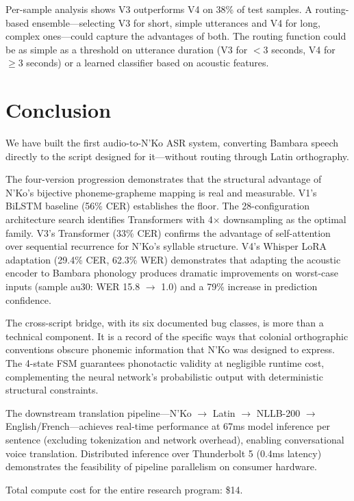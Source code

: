 \documentclass[11pt]{article}
\begin{document}
Per-sample analysis shows V3 outperforms V4 on 38\% of test samples.
A routing-based ensemble---selecting V3 for short, simple utterances and V4 for long, complex ones---could capture the advantages of both.
The routing function could be as simple as a threshold on utterance duration (V3 for $<$3 seconds, V4 for $\geq$3 seconds) or a learned classifier based on acoustic features.

\section{Conclusion}

We have built the first audio-to-N'Ko ASR system, converting Bambara speech directly to the script designed for it---without routing through Latin orthography.

The four-version progression demonstrates that the structural advantage of N'Ko's bijective phoneme-grapheme mapping is real and measurable.
V1's BiLSTM baseline (56\% CER) establishes the floor.
The 28-configuration architecture search identifies Transformers with 4$\times$ downsampling as the optimal family.
V3's Transformer (33\% CER) confirms the advantage of self-attention over sequential recurrence for N'Ko's syllable structure.
V4's Whisper LoRA adaptation (29.4\% CER, 62.3\% WER) demonstrates that adapting the acoustic encoder to Bambara phonology produces dramatic improvements on worst-case inputs (sample au30: WER 15.8 $\to$ 1.0) and a 79\% increase in prediction confidence.

The cross-script bridge, with its six documented bug classes, is more than a technical component.
It is a record of the specific ways that colonial orthographic conventions obscure phonemic information that N'Ko was designed to express.
The 4-state FSM guarantees phonotactic validity at negligible runtime cost, complementing the neural network's probabilistic output with deterministic structural constraints.

The downstream translation pipeline---N'Ko $\to$ Latin $\to$ NLLB-200 $\to$ English/French---achieves real-time performance at 67ms model inference per sentence (excluding tokenization and network overhead), enabling conversational voice translation.
Distributed inference over Thunderbolt 5 (0.4ms latency) demonstrates the feasibility of pipeline parallelism on consumer hardware.

Total compute cost for the entire research program: \$14.
\end{document}
